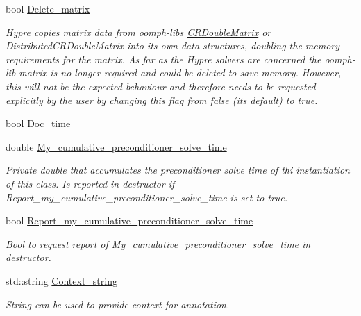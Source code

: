 \begin{DoxyCompactItemize}
\item 
bool \hyperlink{classoomph_1_1HyprePreconditioner_a73c88c3da340f7c3fe9857521b463176}{Delete\+\_\+matrix}
\begin{DoxyCompactList}\small\item\em Hypre copies matrix data from oomph-\/lib\textquotesingle{}s \hyperlink{classoomph_1_1CRDoubleMatrix}{C\+R\+Double\+Matrix} or Distributed\+C\+R\+Double\+Matrix into its own data structures, doubling the memory requirements for the matrix. As far as the Hypre solvers are concerned the oomph-\/lib matrix is no longer required and could be deleted to save memory. However, this will not be the expected behaviour and therefore needs to be requested explicitly by the user by changing this flag from false (its default) to true. \end{DoxyCompactList}\item 
bool \hyperlink{classoomph_1_1HyprePreconditioner_ac88a0ccc5367586dd10e7c7c1a1f6f70}{Doc\+\_\+time}
\item 
double \hyperlink{classoomph_1_1HyprePreconditioner_a812e880bd4518b75c937870c2da0f7cd}{My\+\_\+cumulative\+\_\+preconditioner\+\_\+solve\+\_\+time}
\begin{DoxyCompactList}\small\item\em Private double that accumulates the preconditioner solve time of thi instantiation of this class. Is reported in destructor if Report\+\_\+my\+\_\+cumulative\+\_\+preconditioner\+\_\+solve\+\_\+time is set to true. \end{DoxyCompactList}\item 
bool \hyperlink{classoomph_1_1HyprePreconditioner_a653e88aa4e4f65e16cbae13cc08014c7}{Report\+\_\+my\+\_\+cumulative\+\_\+preconditioner\+\_\+solve\+\_\+time}
\begin{DoxyCompactList}\small\item\em Bool to request report of My\+\_\+cumulative\+\_\+preconditioner\+\_\+solve\+\_\+time in destructor. \end{DoxyCompactList}\item 
std\+::string \hyperlink{classoomph_1_1HyprePreconditioner_a2662d242a5a13b6ce7c4f570e48c2615}{Context\+\_\+string}
\begin{DoxyCompactList}\small\item\em String can be used to provide context for annotation. \end{DoxyCompactList}\end{DoxyCompactItemize}
